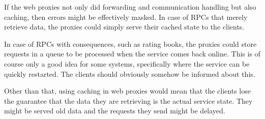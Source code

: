 \documentclass[11pt]{article}
\begin{document}
\begin{enumerate}
    If the web proxies not only did forwarding and communication handling but
    also caching, then errors might be effectively masked. In case of RPCs that
    merely retrieve data, the proxies could simply serve their cached state to
    the clients.

    In case of RPCs with consequences, such as rating books, the proxies could
    store requests in a queue to be processed when the service comes back
    online. This is of course only a good idea for some systems, specifically
    where the service can be quickly restarted. The clients should obviously
    somehow be informed about this.

    Other than that, using caching in web proxies would mean that the clients
    lose the guarantee that the data they are retrieving is the actual service
    state. They might be served old data and the requests they send might be
    delayed.
\end{enumerate}
\end{document}
